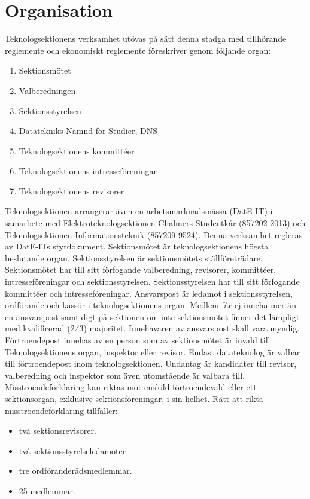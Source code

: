\documentclass[a4paper]{dtek}
\begin{document}
\section{Organisation}
\para[Verksamhetsutövande]
Teknologsektionens verksamhet utövas på sätt denna stadga med tillhörande reglemente och ekonomiskt reglemente föreskriver genom följande organ:
\begin{enumerate}
\item Sektionsmötet
\item Valberedningen
\item Sektionsstyrelsen
\item Datatekniks Nämnd för Studier, DNS
\item Teknologsektionens kommittéer
\item Teknologsektionens intresseföreningar
\item Teknologsektionens revisorer
\end{enumerate}
\stycke Teknologsektionen arrangerar även en arbetsmarknadsmässa (DatE-IT) i samarbete med Elektroteknologsektionen Chalmers Studentkår (857202-2013) och Teknologsektionen Informationsteknik (857209-9524). Denna verksamhet regleras av DatE-ITs styrdokument. 
\para[Ansvarsförhållanden] Sektionsmötet är teknologsektionens högsta beslutande organ.
\para Sektionsstyrelsen är sektionsmötets ställföreträdare.
\para Sektionsmötet har till sitt förfogande valberedning, revisorer, kommittéer, intresseföreningar och sektionsstyrelsen.
\para Sektionsstyrelsen har till sitt förfogande kommittéer och intresseföreningar.
\para[Ansvarspost] Ansvarspost är ledamot i sektionsstyrelsen, ordförande och kassör i teknologsektionens organ.
\para Medlem får ej inneha mer än en ansvarspost samtidigt på sektionen om inte
sektionsmötet finner det lämpligt med kvalificerad (2⁄3) majoritet.
\para Innehavaren av ansvarspost skall vara myndig.
\para[Förtroendepost] Förtroendepost innehas av en person som av sektionsmötet är invald till Teknologsektionens organ, inspektor eller revisor.
\para Endast datateknolog är valbar till förtroendepost inom teknologsektionen. 
\stycke Undantag är kandidater till revisor, valberedning och inspektor som även utomstående är valbara till.
\para[Misstroendeförklaring] Misstroendeförklaring kan riktas mot enskild förtroendevald eller ett sektionsorgan, exklusive sektionsföreningar, i sin helhet.
\para Rätt att rikta misstroendeförklaring tillfaller:
\begin{itemize}
  \item två sektionsrevisorer.
  \item två sektionsstyrelseledamöter.
  \item tre ordföranderådsmedlemmar.
  \item 25 medlemmar.
\end{itemize}
\end{document}
